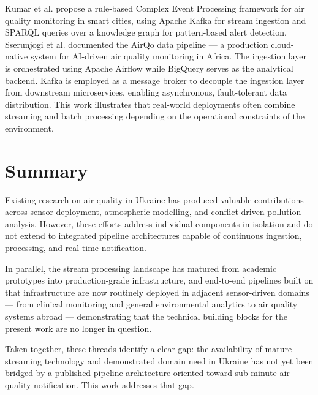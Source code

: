 Kumar et al.\cite{kumar2024cep} propose a rule-based Complex Event Processing framework for air quality monitoring in smart cities, using Apache Kafka for stream ingestion and SPARQL queries over a knowledge graph for pattern-based alert detection. Sserunjogi et al.\cite{sserunjogi2025airqo} documented the AirQo data pipeline — a production cloud-native system for AI-driven air quality monitoring in Africa. The ingestion layer is orchestrated using Apache Airflow while BigQuery serves as the analytical backend. Kafka is employed as a message broker to decouple the ingestion layer from downstream microservices, enabling asynchronous, fault-tolerant data distribution. This work illustrates that real-world deployments often combine streaming and batch processing depending on the operational constraints of the environment.

\section{Summary}

Existing research on air quality in Ukraine has produced valuable contributions across sensor deployment, atmospheric modelling, and conflict-driven pollution analysis\cite{shelestov2020essential, svidzinska2020citizen, MALYTSKA2026108959}. However, these efforts address individual components in isolation and do not extend to integrated pipeline architectures capable of continuous ingestion, processing, and real-time notification.

In parallel, the stream processing landscape has matured from academic prototypes into production-grade infrastructure, and end-to-end pipelines built on that infrastructure are now routinely deployed in adjacent sensor-driven domains — from clinical monitoring and general environmental analytics to air quality systems abroad — demonstrating that the technical building blocks for the present work are no longer in question.

Taken together, these threads identify a clear gap: the availability of mature streaming technology and demonstrated domain need in Ukraine has not yet been bridged by a published pipeline architecture oriented toward sub-minute air quality notification. This work addresses that gap.